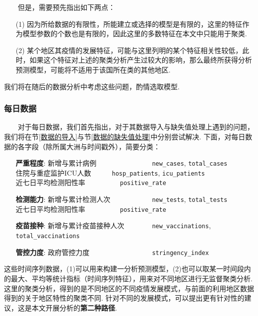 \documentclass[a4paper, titlepage]{article}
\begin{document}
        　　但是，需要预先指出如下两点：
        \begin{enumerate}[itemsep=-2pt,topsep=1pt]
            \item [(1)] 因为所给数据的有限性，所能建立或选择的模型是有限的，这里的特征作为模型参数的个数也是有限的，因此这里的多数特征在本文中只能用于聚类.
            \item [(2)] 某个地区其疫情的发展特征，可能与这里列明的某个特征相关性较低，此时，如果这个特征对上述的聚类分析产生过较大的影响，那么最终所获得分析预测模型，可能将不适用于该国所在类的其他地区.
        \end{enumerate}
        我们将在随后的数据分析中考虑这些问题，酌情选取模型.

        \subsubsection*{每日数据}
        　　对于每日数据，我们首先指出，对于其数据导入与缺失值处理上遇到的问题，我们将在节\ref{数据的导入}与节\ref{数据的缺失值处理}中分别尝试解决. 下面，对每日数据的各字段（除所属大洲与时间戳外），简要分类：
        \vspace{5pt}
        \begin{adjustwidth}{1cm}{0cm}
        {\kaishu
        \begin{itemize}[itemsep=-1pt,topsep=1pt]
            \item [\textbf{严重程度}:] 
                新增与累计病例　　　　　　　　\texttt{new\_cases}, \texttt{total\_cases}\\
                住院与重症监护ICU人数　　　\hspace{1em}\texttt{hosp\_patients}, \texttt{icu\_patients}\\
                近七日平均检测阳性率　　　　　\texttt{positive\_rate}
            \item [\textbf{检测能力}:]
                新增与累计检测人次　　　　　　\texttt{new\_tests}, \texttt{total\_tests}\\
                近七日平均检测阳性率　　　　　\texttt{positive\_rate}
            \item [\textbf{疫苗接种}:] 
                新增与累计疫苗接种人次　　　　\texttt{new\_vaccinations}, \texttt{total\_vaccinations}
            \item [\textbf{管控力度}:] 
                政府管控力度　　　　　　　　　\texttt{stringency\_index}
        \end{itemize}
        }
        \end{adjustwidth}
        \vspace{5pt}
        这些时间序列数据，(1)可以用来构建一分析预测模型，(2)也可以取某一时间段内的最大、平均等统计指标（时间序列特征），用来对不同地区进行无监督聚类分析. 这里的聚类分析，得到的是不同地区的不同疫情发展模式，与前面的利用地区数据得到的关于地区特性的聚类不同. 针对不同的发展模式，可以提出更有针对性的建议，这是本文开展分析的\textbf{第二种路径}.
\end{document}
